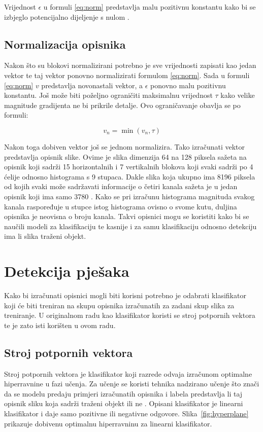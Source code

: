 \documentclass[times, utf8, zavrsni]{fer}
\begin{document}
Vrijednost $\epsilon$ u formuli \ref{eq:norm} predstavlja malu pozitivnu konstantu kako bi se izbjeglo potencijalno dijeljenje s nulom \citep{tomasi2012histograms}.

\section{Normalizacija opisnika}
Nakon što su blokovi normalizirani potrebno je sve vrijednosti zapisati kao jedan vektor te taj vektor ponovno normalizirati formulom \ref{eq:norm}. Sada u formuli \ref{eq:norm} \(v\) predstavlja novonastali vektor, a $\epsilon$ ponovno malu pozitivnu konstantu. Još može biti poželjno ograničiti maksimalnu vrijednost $\tau$ kako velike magnitude gradijenta ne bi prikrile detalje. Ovo ograničavanje obavlja se po formuli:

\begin{equation}
	v_n = \min(v_n, \tau)
	\label{eq:limit}
\end{equation}

Nakon toga dobiven vektor još se jednom normalizira. Tako izračunati vektor predstavlja opisnik slike. Ovime je slika dimenzija 64 na 128 piksela sažeta na opisnik koji sadrži 15 horizontalnih i 7 vertikalnih blokova koji svaki sadrži po 4 ćelije odnosno histograma s 9 stupaca. Dakle slika koja ukupno ima 8196 piksela od kojih svaki može sadržavati informacije o četiri kanala sažeta je u jedan opisnik koji ima samo 3780 \citep{tomasi2012histograms}. Kako se pri izračunu histograma magnituda svakog kanala raspoređuje u stupce istog histograma ovisno o svome kutu, duljina opisnika je neovisna o broju kanala. Takvi opisnici mogu se koristiti kako bi se naučili modeli za klasifikaciju te kasnije i za samu klasifikaciju odnosno detekciju ima li slika traženi objekt.

\chapter{Detekcija pješaka}
Kako bi izračunati opisnici mogli biti korisni potrebno je odabrati klasifikator koji će biti treniran na skupu opisnika izračunatih za zadani skup slika za treniranje. U originalnom radu \cite{dalal2005histograms} kao klasifikator koristi se stroj potpornih vektora te je zato isti korišten u ovom radu.

\section{Stroj potpornih vektora}
Stroj potpornih vektora  je klasifikator koji razrede odvaja izračunom optimalne hiperravnine u fazi učenja. Za učenje se koristi tehnika nadzirano učenje što znači da se modelu predaju primjeri izračunatih opisnika i labela predstavlja li taj opisnik sliku koja sadrži traženi objekt ili ne \citep{svm}. Opisani klasifikator je linearni klasifikator i daje samo pozitivne ili negativne odgovore. Slika~\ref{fig:hyperplane} prikazuje dobivenu optimalnu hiperravninu za linearni klasifikator.
\end{document}
